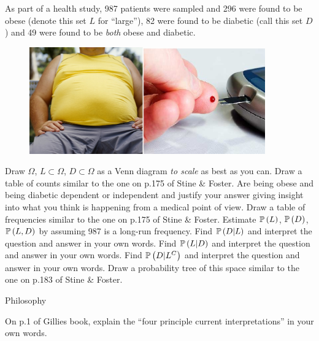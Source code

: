 \documentclass[12pt]{article}
\begin{document}
\problem As part of a health study, 987 patients were sampled and 296 were found to be obese (denote this set $L$ for ``large''), 82 were found to be diabetic (call this set $D$) and 49 were found to be \textit{both} obese and diabetic.

\begin{figure}[htp]
\centering
\includegraphics[width=4in, height=1.81in]{diabetes.jpg}
\end{figure}
\FloatBarrier 

\begin{enumerate}
\easysubproblem Draw $\Omega$, $L \subset \Omega$, $D \subset \Omega$ as a Venn diagram \textit{to scale} as best as you can.
\easysubproblem Draw a table of counts similar to the one on p.175 of Stine \& Foster.
\easysubproblem Are being obese and being diabetic dependent or independent and justify your answer giving insight into what you think is happening from a medical point of view.
\easysubproblem Draw a table of frequencies similar to the one on p.175 of Stine \& Foster. 
\easysubproblem Estimate $\mathbb{P}\left(L\right)$, $\mathbb{P}\left(D\right)$, $\mathbb{P}\left(L,D\right)$ by assuming 987 is a long-run frequency.
\easysubproblem Find $\mathbb{P}\left(D | L\right)$ and interpret the question and answer in your own words.
\intermediatesubproblem Find $\mathbb{P}\left(L | D\right)$ and interpret the question and answer in your own words.
\intermediatesubproblem Find $\mathbb{P}\left(D | L^C\right)$ and interpret the question and answer in your own words.
\intermediatesubproblem Draw a probability tree of this space similar to the one on p.183 of Stine \& Foster.
\end{enumerate}

\problem Philosophy

\begin{enumerate}
\extracreditsubproblem On p.1 of Gillies book, explain the ``four principle current interpretations'' in your own words. 
\end{enumerate}
\end{document}

